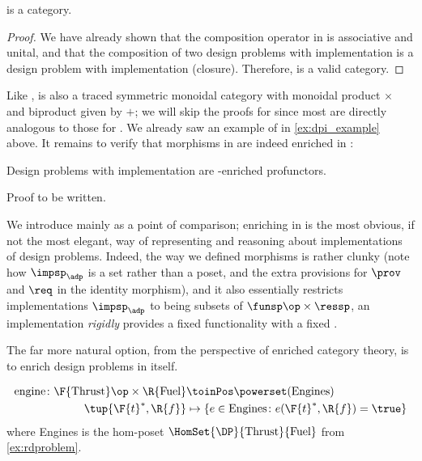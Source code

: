 {    \begin{lemma}
        \DPI is a category.
    \end{lemma}

    \begin{proof}
        We have already shown that the composition operator in \DPI is associative and unital, and that the composition of two design problems with implementation is a design problem with implementation (closure). Therefore, \DPI is a valid category.
    \end{proof}

    Like \DP, \DPI is also a traced symmetric monoidal category with monoidal product $\times$ and biproduct given by $+$; we will skip the proofs for \DPI since most are directly analogous to those for \DP. We already saw an example of \DPI in \cref{ex:dpi_example} above. It remains to verify that morphisms in \DPI are indeed enriched in \Set:

    \begin{proposition}
        Design problems with implementation are \Set-enriched profunctors.
    \end{proposition}
    \begin{publictodo}
        Proof to be written.
    \end{publictodo}
    We introduce \DPI mainly as a point of comparison; enriching in \Set is the most obvious, if not the most elegant, way of representing and reasoning about implementations of design problems. Indeed, the way we defined morphisms is rather clunky (note how $\impsp_\adp$ is a set rather than a poset, and the extra provisions for $\prov$ and $\req$ in the identity morphism), and it also essentially restricts implementations $\impsp_\adp$ to being subsets of $\funsp\op \times \ressp$, \ie  an implementation \emph{rigidly} provides a fixed functionality \fun with a fixed \res.

    The far more natural option, from the perspective of enriched category theory, is to enrich design problems in \DP itself.

    \begin{example}
        \begin{equation}
            \begin{aligned}
                \text{engine} \colon \F{\text{Thrust}}\op \times \R{\text{Fuel}} &\toinPos \powerset(\text{Engines}) \\
                \tup{\F{t}^*,\R{f}} &\mapsto \{ e \in \text{Engines} \colon e(\F{t}^*, \R{f}) = \true \}
            \end{aligned}
        \end{equation}
        where Engines is the hom-poset $\HomSet{\DP}{\text{Thrust}}{\text{Fuel}}$ from \cref{ex:rdproblem}.
    \end{example}

}
